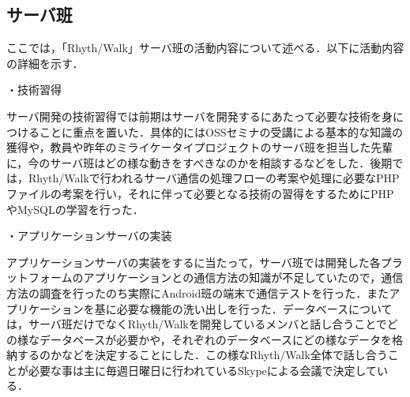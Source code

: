 \subsection{サーバ班}
\par
ここでは，「Rhyth/Walk」サーバ班の活動内容について述べる．以下に活動内容の詳細を示す．
\par
・技術習得
\par
サーバ開発の技術習得では前期はサーバを開発するにあたって必要な技術を身につけることに重点を置いた．具体的にはOSSセミナの受講による基本的な知識の獲得や，教員や昨年のミライケータイプロジェクトのサーバ班を担当した先輩に，今のサーバ班はどの様な動きをすべきなのかを相談するなどをした．後期では，Rhyth/Walkで行われるサーバ通信の処理フローの考案や処理に必要なPHPファイルの考案を行い，それに伴って必要となる技術の習得をするためにPHPやMySQLの学習を行った．
\par
・アプリケーションサーバの実装
\par
アプリケーションサーバの実装をするに当たって，サーバ班では開発した各プラットフォームのアプリケーションとの通信方法の知識が不足していたので，通信方法の調査を行ったのち実際にAndroid班の端末で通信テストを行った．またアプリケーションを基に必要な機能の洗い出しを行った．データベースについては，サーバ班だけでなくRhyth/Walkを開発しているメンバと話し合うことでどの様なデータベースが必要かや，それぞれのデータベースにどの様なデータを格納するのかなどを決定することにした．この様なRhyth/Walk全体で話し合うことが必要な事は主に毎週日曜日に行われているSkypeによる会議で決定している．
\par
{}
